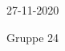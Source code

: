 \begin{titlepage}
\begin{center}
\begin{center}
\end{center}

27-11-2020

\vspace{0.1cm}

Gruppe 24
\end{center}
\end{titlepage}